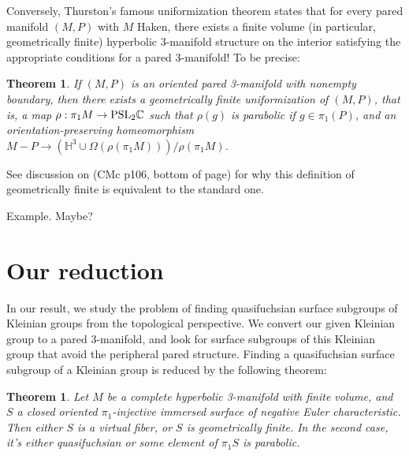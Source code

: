 \documentclass[12pt]{amsart}
\newtheorem{thm}[theorem]{Theorem}
\theoremstyle{definition}
\newcommand{\Om}{\Omega}
\newcommand{\PSL}{\mbox{\rm{PSL}}}
\begin{document}
Conversely, Thurston's famous uniformization theorem states that for every
pared manifold $(M,P)$ with $M$ Haken, there exists a finite volume (in
particular, geometrically finite) hyperbolic 3-manifold structure on the
interior satisfying the appropriate conditions for a pared 3-manifold! To be
precise:



\begin{thm}

If $(M,P)$ is an oriented pared 3-manifold with nonempty boundary, then
there exists a geometrically finite uniformization of $(M,P)$, that is, a map
$\rho: \pi_1M \to \PSL_2\mathbb{C}$ such that $\rho(g)$ is parabolic if $g \in
\pi_1(P)$, and an
orientation-preserving homeomorphism $M-P \to \left(\mathbb{H}^3
\cup \Om(\rho(\pi_1M))\right)/\rho(\pi_1M)$.

\end{thm}

See discussion on (CMc p106, bottom of page) for why this definition of
geometrically finite is equivalent to the standard one.

Example. Maybe? %

\section{Our reduction}

In our result, we study the problem of finding quasifuchsian surface subgroups
of Kleinian groups from the topological perspective. We convert our given
Kleinian group to a pared 3-manifold, and look for surface subgroups of this
Kleinian group that avoid the peripheral pared structure. Finding
a quasifuchsian surface subgroup of a Kleinian group is reduced by the
following theorem:

\begin{thm}

Let $M$ be a complete hyperbolic 3-manifold with finite volume, and $S$
a closed oriented $\pi_1$-injective immersed surface of negative Euler
characteristic. Then either $S$ is a virtual fiber, or $S$ is geometrically
finite. In the second case, it's either quasifuchsian or some element of
$\pi_1S$ is parabolic.

\end{thm}
\end{document}
